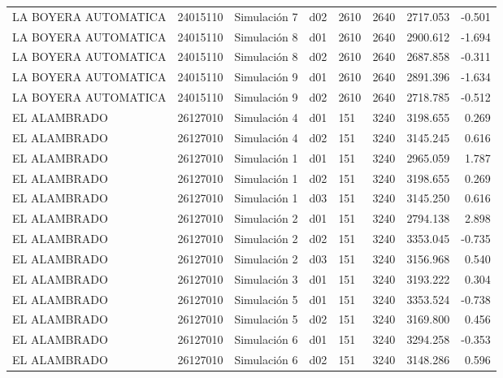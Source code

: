 \begin{landscape}
\begin{longtable}{lrlp{2cm}p{2cm}p{3cm}p{2cm}r}
    LA BOYERA AUTOMATICA &  24015110 &   Simulación 7 &   d02 &      2610 &     2640 &  2717.053 &    -0.501 \\
    LA BOYERA AUTOMATICA &  24015110 &   Simulación 8 &   d01 &      2610 &     2640 &  2900.612 &    -1.694 \\
    LA BOYERA AUTOMATICA &  24015110 &   Simulación 8 &   d02 &      2610 &     2640 &  2687.858 &    -0.311 \\
    LA BOYERA AUTOMATICA &  24015110 &   Simulación 9 &   d01 &      2610 &     2640 &  2891.396 &    -1.634 \\
    LA BOYERA AUTOMATICA &  24015110 &   Simulación 9 &   d02 &      2610 &     2640 &  2718.785 &    -0.512 \\
            EL ALAMBRADO &  26127010 &   Simulación 4 &   d01 &       151 &     3240 &  3198.655 &     0.269 \\
            EL ALAMBRADO &  26127010 &   Simulación 4 &   d02 &       151 &     3240 &  3145.245 &     0.616 \\
            EL ALAMBRADO &  26127010 &   Simulación 1 &   d01 &       151 &     3240 &  2965.059 &     1.787 \\
            EL ALAMBRADO &  26127010 &   Simulación 1 &   d02 &       151 &     3240 &  3198.655 &     0.269 \\
            EL ALAMBRADO &  26127010 &   Simulación 1 &   d03 &       151 &     3240 &  3145.250 &     0.616 \\
            EL ALAMBRADO &  26127010 &   Simulación 2 &   d01 &       151 &     3240 &  2794.138 &     2.898 \\
            EL ALAMBRADO &  26127010 &   Simulación 2 &   d02 &       151 &     3240 &  3353.045 &    -0.735 \\
            EL ALAMBRADO &  26127010 &   Simulación 2 &   d03 &       151 &     3240 &  3156.968 &     0.540 \\
            EL ALAMBRADO &  26127010 &   Simulación 3 &   d01 &       151 &     3240 &  3193.222 &     0.304 \\
            EL ALAMBRADO &  26127010 &   Simulación 5 &   d01 &       151 &     3240 &  3353.524 &    -0.738 \\
            EL ALAMBRADO &  26127010 &   Simulación 5 &   d02 &       151 &     3240 &  3169.800 &     0.456 \\
            EL ALAMBRADO &  26127010 &   Simulación 6 &   d01 &       151 &     3240 &  3294.258 &    -0.353 \\
            EL ALAMBRADO &  26127010 &   Simulación 6 &   d02 &       151 &     3240 &  3148.286 &     0.596 \\

\end{longtable}
\end{landscape}
